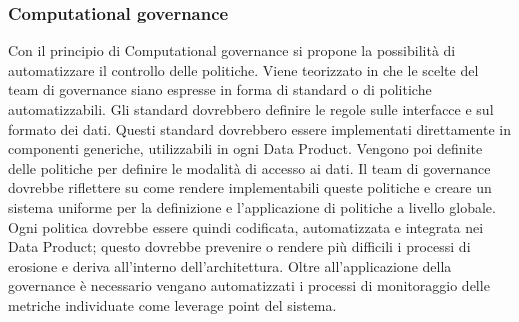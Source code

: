 \documentclass[a4paper,12pt]{report}
\begin{document}
\subsubsection{Computational governance}
Con il principio di Computational governance si propone la possibilità di automatizzare il controllo delle politiche.
Viene teorizzato in \cite{dehghani_data_2022} che le scelte del team di governance siano espresse in forma di standard o di politiche automatizzabili.
Gli standard dovrebbero definire le regole sulle interfacce e sul formato dei dati. 
Questi standard dovrebbero essere implementati direttamente in componenti generiche, utilizzabili in ogni Data Product.
Vengono poi definite delle politiche per definire le modalità di accesso ai dati.
Il team di governance dovrebbe riflettere su come rendere implementabili queste politiche e creare un sistema uniforme per la definizione e l'applicazione di politiche a livello globale. 
Ogni politica dovrebbe essere quindi codificata, automatizzata e integrata nei Data Product; questo dovrebbe prevenire o rendere più difficili i processi di erosione e deriva all'interno dell'architettura.
Oltre all'applicazione della governance è necessario vengano automatizzati i processi di monitoraggio delle metriche individuate come leverage point del sistema.
\end{document}
